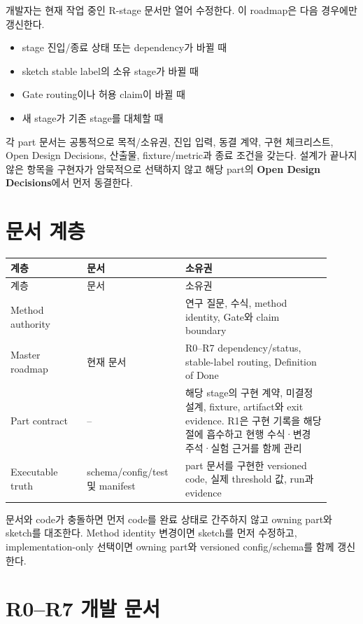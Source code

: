 \documentclass[10pt]{article}
\begin{document}
개발자는 현재 작업 중인 R-stage 문서만 열어 수정한다. 이 roadmap은 다음 경우에만 갱신한다.
\begin{itemize}
  \item stage 진입/종료 상태 또는 dependency가 바뀔 때
  \item sketch stable label의 소유 stage가 바뀔 때
  \item Gate routing이나 허용 claim이 바뀔 때
  \item 새 stage가 기존 stage를 대체할 때
\end{itemize}

각 part 문서는 공통적으로 목적/소유권, 진입 입력, 동결 계약, 구현 체크리스트,
Open Design Decisions, 산출물, fixture/metric과 종료 조건을 갖는다.
설계가 끝나지 않은 항목을 구현자가 암묵적으로 선택하지 않고 해당 part의
\textbf{Open Design Decisions}에서 먼저 동결한다.

\section{문서 계층}

\begin{longtable}{L{0.22\linewidth}L{0.27\linewidth}L{0.42\linewidth}}
\toprule
계층 & 문서 & 소유권\\
\midrule
\endfirsthead
\toprule
계층 & 문서 & 소유권\\
\midrule
\endhead
Method authority &
 &
연구 질문, 수식, method identity, Gate와 claim boundary\\
Master roadmap &
현재 문서 &
R0--R7 dependency/status, stable-label routing, Definition of Done\\
Part contract &
-- &
해당 stage의 구현 계약, 미결정 설계, fixture, artifact와 exit evidence.
R1은 구현 기록을 해당 절에 흡수하고 현행 수식·변경 주석·실험 근거를 함께 관리\\
Executable truth &
 schema/config/test 및  manifest &
part 문서를 구현한 versioned code, 실제 threshold 값, run과 evidence\\
\bottomrule
\end{longtable}

문서와 code가 충돌하면 먼저 code를 완료 상태로 간주하지 않고 owning part와 sketch를 대조한다.
Method identity 변경이면 sketch를 먼저 수정하고, implementation-only 선택이면 owning part와
versioned config/schema를 함께 갱신한다.

\section{R0--R7 개발 문서}
\end{document}
